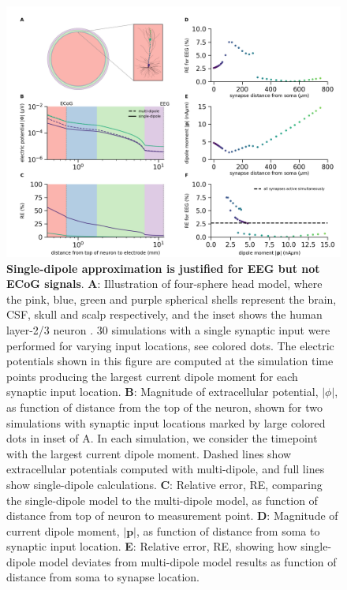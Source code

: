 \documentclass[preprint,10pt,authoryear]{elsarticle}
\newcommand{\hlg}[2][Emerald]{ {\sethlcolor{#1} \hl{#2}} }
\newcommand{\sntxt}[1]{{\color{NavyBlue}#1}}
\newcommand{\tvnnote}[1]{\color{white}{\hlg{TVN: #1 }}\color{black}}
\begin{document}
\begin{figure}[H]
	\centering
	\includegraphics[width=1.0\textwidth]{fig_compare_multi_single_dipole_segev_syns_from_path.png}
	\caption{\textbf{Single-dipole approximation is justified for EEG but not ECoG signals}. 
	\textbf{A}: Illustration of four-sphere head model, where the pink, blue, green and purple spherical shells represent the brain, CSF, skull and scalp respectively, and the inset shows the human layer-2/3 neuron \citep{EYAL2016}. $30$ simulations with a single synaptic input were performed for varying input locations, see colored dots. \sntxt{The electric potentials shown in this figure are computed at the simulation time points producing the largest current dipole moment for each synaptic input location.}
	\textbf{B}: Magnitude of extracellular potential, $|\phi|$, as function of distance from the top of the neuron, shown for two simulations with synaptic input locations marked by large colored dots in inset of A. In each simulation, we consider the timepoint with the largest current dipole moment. Dashed lines show extracellular potentials computed with multi-dipole, and full lines show single-dipole calculations.
	\textbf{C}: Relative error, RE, comparing the single-dipole model to the multi-dipole model, as function of distance from top of neuron to measurement point.
	\textbf{D}: Magnitude of current dipole moment, $|\mathbf{p}|$, as function of distance from soma to synaptic input location.
	\textbf{E}: Relative error, RE, showing how single-dipole model deviates from multi-dipole model results as function of distance from soma to synapse location.
}
\end{figure}
\end{document}
